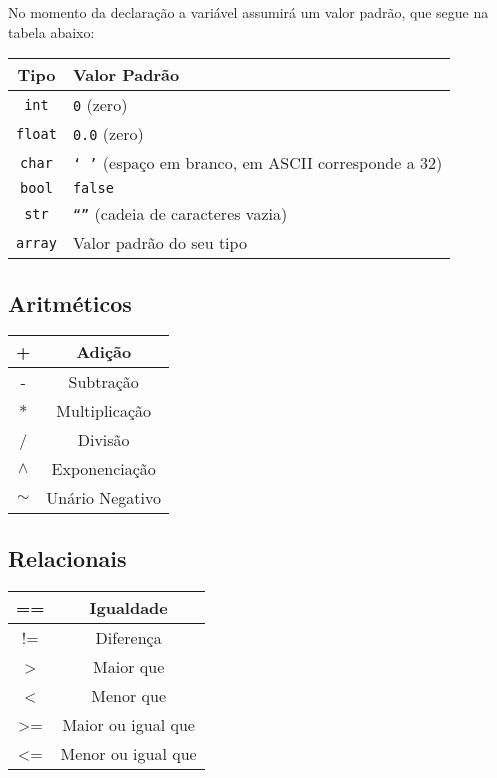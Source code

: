 \documentclass[a4paper,11pt]{article}
\begin{document}
No momento da declaração a variável assumirá um valor padrão, que segue na tabela abaixo:
\\
\begin{center}
    \begin{tabular}{|c|l|}
         \hline
         \textbf{Tipo} & \textbf{Valor Padrão}\\
         \hline
         \texttt{int} & \texttt{0} (zero)\\
         \hline
         \texttt{float} & \texttt{0.0} (zero)\\
         \hline
         \texttt{char} & \texttt{` '} (espaço em branco, em ASCII corresponde a 32)\\
         \hline
         \texttt{bool} & \texttt{false}\\
         \hline
         \texttt{str} & \texttt{``''} (cadeia de caracteres vazia)\\
         \hline
         \texttt{array} & Valor padrão do seu tipo\\
         \hline
    \end{tabular}
\end{center}

\subsection{Aritméticos}
\begin{center}
    \begin{tabular}{|c|c|}
         \hline
         + & Adição\\
         \hline
         - & Subtração\\
         \hline
         $\ast$ & Multiplicação\\
         \hline
         / & Divisão\\
         \hline
         $\wedge$ & Exponenciação\\
         \hline
         $\sim$ & Unário Negativo\\
         \hline
    \end{tabular}
\end{center}

\subsection{Relacionais}
\begin{center}
    \begin{tabular}{|c|c|}
         \hline
         == & Igualdade\\
         \hline
         != & Diferença\\
         \hline
         > & Maior que\\
         \hline
         < & Menor que\\
         \hline
         >= & Maior ou igual que\\
         \hline
         <= & Menor ou igual que\\
         \hline
    \end{tabular}
\end{center}
\end{document}
